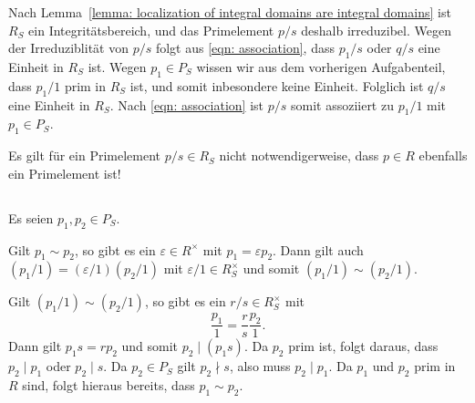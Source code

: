 \documentclass[a4paper,10pt,numbers=noenddot]{scrartcl}
\begin{document}
Nach Lemma~\ref{lemma: localization of integral domains are integral domains} ist $R_S$ ein Integritätsbereich, und das Primelement $p/s$ deshalb irreduzibel.
Wegen der Irreduziblität von $p/s$ folgt aus \eqref{eqn: association}, dass $p_1/s$ oder $q/s$ eine Einheit in $R_S$ ist.
Wegen $p_1 \in P_S$ wissen wir aus dem vorherigen Aufgabenteil, dass $p_1/1$ prim in $R_S$ ist, und somit inbesondere keine Einheit.
Folglich ist $q/s$ eine Einheit in $R_S$.
Nach \eqref{eqn: association} ist $p/s$ somit assoziiert zu $p_1/1$ mit $p_1 \in P_S$.

\begin{warning}
  Es gilt für ein Primelement $p/s \in R_S$ nicht notwendigerweise, dass $p \in R$ ebenfalls ein Primelement ist!
\end{warning}






\subsection{}

Es seien $p_1, p_2 \in P_S$.

Gilt $p_1 \sim p_2$, so gibt es ein $\varepsilon \in R^\times$ mit $p_1 = \varepsilon p_2$.
Dann gilt auch $(p_1/1) = (\varepsilon/1)(p_2/1)$ mit $\varepsilon/1 \in R_S^\times$ und somit $(p_1/1) \sim (p_2/1)$.

Gilt $(p_1/1) \sim (p_2/1)$, so gibt es ein $r/s \in R_S^\times$ mit
\[
    \frac{p_1}{1}
  = \frac{r}{s} \frac{p_2}{1}.
\]
Dann gilt $p_1 s = r p_2$ und somit $p_2 \mid (p_1 s)$.
Da $p_2$ prim ist, folgt daraus, dass $p_2 \mid p_1$ oder $p_2 \mid s$.
Da $p_2 \in P_S$ gilt $p_2 \nmid s$, also muss $p_2 \mid p_1$.
Da $p_1$ und $p_2$ prim in $R$ sind, folgt hieraus bereits, dass $p_1 \sim p_2$.
\end{document}
